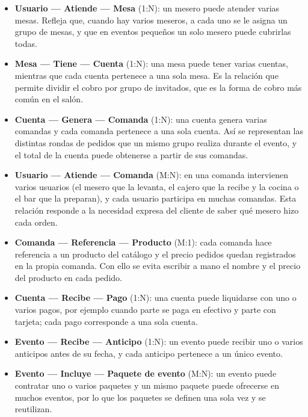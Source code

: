 \begin{itemize}
    \item \textbf{Usuario --- Atiende --- Mesa} (1:N): un mesero puede atender varias mesas. Refleja que, cuando hay varios meseros, a cada uno se le asigna un grupo de mesas, y que en eventos pequeños un solo mesero puede cubrirlas todas.

    \item \textbf{Mesa --- Tiene --- Cuenta} (1:N): una mesa puede tener varias cuentas, mientras que cada cuenta pertenece a una sola mesa. Es la relación que permite dividir el cobro por grupo de invitados, que es la forma de cobro más común en el salón.

    \item \textbf{Cuenta --- Genera --- Comanda} (1:N): una cuenta genera varias comandas y cada comanda pertenece a una sola cuenta. Así se representan las distintas rondas de pedidos que un mismo grupo realiza durante el evento, y el total de la cuenta puede obtenerse a partir de sus comandas.

    \item \textbf{Usuario --- Atiende --- Comanda} (M:N): en una comanda intervienen varios usuarios (el mesero que la levanta, el cajero que la recibe y la cocina o el bar que la preparan), y cada usuario participa en muchas comandas. Esta relación responde a la necesidad expresa del cliente de saber qué mesero hizo cada orden.

    \item \textbf{Comanda --- Referencia --- Producto} (M:1): cada comanda hace referencia a un producto del catálogo y el precio pedidos quedan registrados en la propia comanda. Con ello se evita escribir a mano el nombre y el precio del producto en cada pedido.

    \item \textbf{Cuenta --- Recibe --- Pago} (1:N): una cuenta puede liquidarse con uno o varios pagos, por ejemplo cuando parte se paga en efectivo y parte con tarjeta; cada pago corresponde a una sola cuenta.

    \item \textbf{Evento --- Recibe --- Anticipo} (1:N): un evento puede recibir uno o varios anticipos antes de su fecha, y cada anticipo pertenece a un único evento.

    \item \textbf{Evento --- Incluye --- Paquete de evento} (M:N): un evento puede contratar uno o varios paquetes y un mismo paquete puede ofrecerse en muchos eventos, por lo que los paquetes se definen una sola vez y se reutilizan.


\end{itemize}
